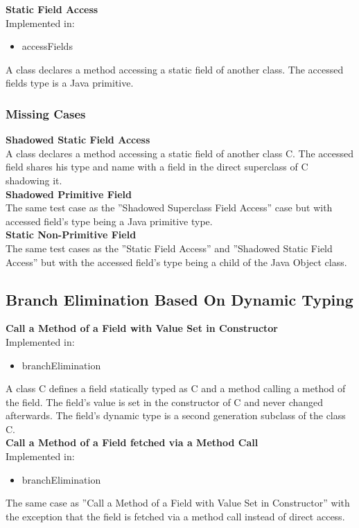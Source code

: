 \documentclass{article}
\begin{document}
\noindent
\textbf{Static Field Access}\\
Implemented in: 
\begin{itemize}
    \item accessFields
\end{itemize}
A class declares a method accessing a static field of another class. The accessed fields type is a Java primitive.\\

\subsubsection{Missing Cases}

\textbf{Shadowed Static Field Access}\\
A class declares a method accessing a static field of another class C. The accessed field shares his type and name with a field in the direct superclass of C shadowing it.\\

\noindent
\textbf{Shadowed Primitive Field}\\
The same test case as the ''Shadowed Superclass Field Access'' case but with accessed field's type being a Java primitive type.\\

\noindent
\textbf{Static Non-Primitive Field}\\
The same test cases as the ''Static Field Access'' and ''Shadowed Static Field Access'' but with the accessed field's type being a child of the Java Object class.\\


\subsection{Branch Elimination Based On Dynamic Typing}

\textbf{Call a Method of a Field with Value Set in Constructor}\\
Implemented in: 
\begin{itemize}
    \item branchElimination
\end{itemize}
A class C defines a field statically typed as C and a method calling a method of the field. The field's value is set in the constructor of C and never changed afterwards. The field's dynamic type is a second generation subclass of the class C.\\

\noindent
\textbf{Call a Method of a Field fetched via a Method Call}\\
Implemented in: 
\begin{itemize}
    \item branchElimination
\end{itemize}
The same case as ''Call a Method of a Field with Value Set in Constructor'' with the exception that the field is fetched via a method call instead of direct access.\\
\end{document}
